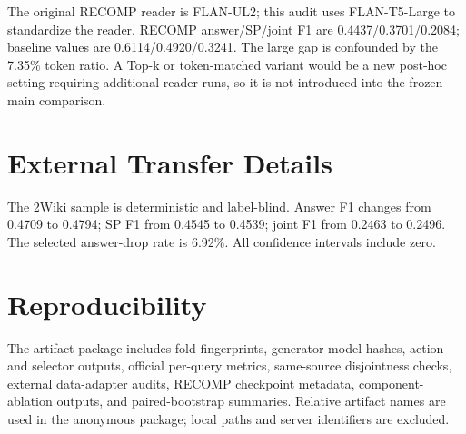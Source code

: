 \begin{table}[t]
\centering
\small
\caption{RECOMP fairness and context-budget audit.}
\label{tab:app-3}
\end{table}

The original RECOMP reader is FLAN-UL2; this audit uses FLAN-T5-Large to standardize the reader. RECOMP answer/SP/joint F1 are 0.4437/0.3701/0.2084; baseline values are 0.6114/0.4920/0.3241. The large gap is confounded by the 7.35\% token ratio. A Top-k or token-matched variant would be a new post-hoc setting requiring additional reader runs, so it is not introduced into the frozen main comparison.

\section{External Transfer Details}

The 2Wiki sample is deterministic and label-blind. Answer F1 changes from 0.4709 to 0.4794; SP F1 from 0.4545 to 0.4539; joint F1 from 0.2463 to 0.2496. The selected answer-drop rate is 6.92\%. All confidence intervals include zero.

\section{Reproducibility}

The artifact package includes fold fingerprints, generator model hashes, action and selector outputs, official per-query metrics, same-source disjointness checks, external data-adapter audits, RECOMP checkpoint metadata, component-ablation outputs, and paired-bootstrap summaries. Relative artifact names are used in the anonymous package; local paths and server identifiers are excluded.
